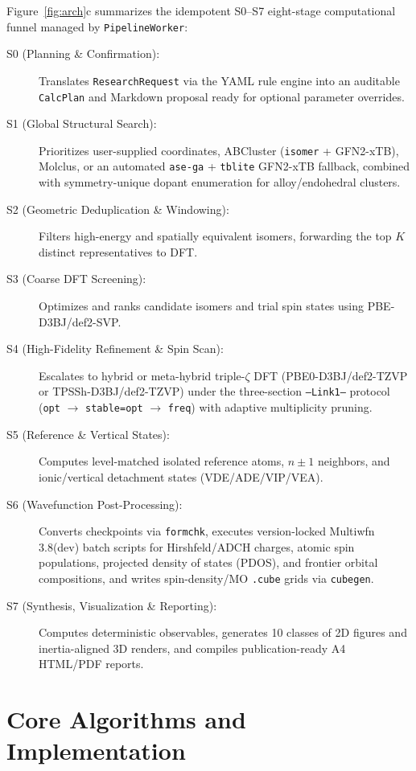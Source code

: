 \documentclass[journal=jcisd8,manuscript=article]{achemso}
\begin{document}
Figure~\ref{fig:arch}c summarizes the idempotent S0--S7 eight-stage computational funnel managed by \texttt{PipelineWorker}:
\begin{description}
  \item[S0 (Planning \& Confirmation):] Translates \texttt{ResearchRequest} via the YAML rule engine into an auditable \texttt{CalcPlan} and Markdown proposal ready for optional parameter overrides.
  \item[S1 (Global Structural Search):] Prioritizes user-supplied coordinates, ABCluster (\texttt{isomer} + GFN2-xTB), Molclus, or an automated \texttt{ase-ga} + \texttt{tblite} GFN2-xTB fallback, combined with symmetry-unique dopant enumeration for alloy/endohedral clusters.
  \item[S2 (Geometric Deduplication \& Windowing):] Filters high-energy and spatially equivalent isomers, forwarding the top $K$ distinct representatives to DFT.
  \item[S3 (Coarse DFT Screening):] Optimizes and ranks candidate isomers and trial spin states using PBE-D3BJ/def2-SVP.\cite{perdew1996pbe,grimme2011d3bj,weigend2005def2}
  \item[S4 (High-Fidelity Refinement \& Spin Scan):] Escalates to hybrid or meta-hybrid triple-$\zeta$ DFT (PBE0-D3BJ/def2-TZVP\cite{adamo1999pbe0} or TPSSh-D3BJ/def2-TZVP\cite{staroverov2003tpssh}) under the three-section \texttt{--Link1--} protocol (\texttt{opt} $\rightarrow$ \texttt{stable=opt} $\rightarrow$ \texttt{freq}) with adaptive multiplicity pruning.
  \item[S5 (Reference \& Vertical States):] Computes level-matched isolated reference atoms, $n \pm 1$ neighbors, and ionic/vertical detachment states (VDE/ADE/VIP/VEA).\cite{jian2019pes}
  \item[S6 (Wavefunction Post-Processing):] Converts checkpoints via \texttt{formchk}, executes version-locked Multiwfn 3.8(dev)\cite{lu2012multiwfn} batch scripts for Hirshfeld/ADCH charges, atomic spin populations, projected density of states (PDOS), and frontier orbital compositions, and writes spin-density/MO \texttt{.cube} grids via \texttt{cubegen}.
  \item[S7 (Synthesis, Visualization \& Reporting):] Computes deterministic observables, generates 10 classes of 2D figures and inertia-aligned 3D renders, and compiles publication-ready A4 HTML/PDF reports.
\end{description}

\section{Core Algorithms and Implementation}
\end{document}
